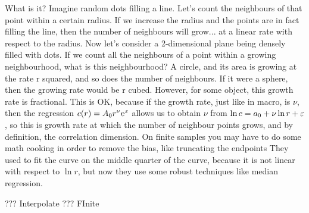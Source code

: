 \documentclass[final,pdftex]{../../template/epsilonj}
\begin{document}
What is it? Imagine random dots filling a line. Let's count the neighbours of that point within a certain radius. If we increase the radius and the points are in fact filling the line, then the number of neighbours will grow... at a linear rate with respect to the radius. Now let's consider a 2-dimensional plane being densely filled with dots. If we count all the neighbours of a point within a growing neighbourhood, what is this neighbourhood? A circle, and its area is growing at the rate r squared, and so does the number of neighbours. If it were a sphere, then the growing rate would be r cubed. However, for some object, this growth rate is fractional. This is OK, because if the growth rate, just like in macro, is $\nu$, then the regression $c(r) = A_0 r^\nu {\mkern1mu\mathrm{e}\mkern1mu}^\varepsilon$ allows us to obtain $\nu$ from $\ln c = a_0 + \nu \ln r + \varepsilon$, so this is growth rate at which the number of neighbour points grows, and by definition, the correlation dimension.
On finite samples you may have to do some math cooking in order to remove the bias, like truncating the endpoints 
They used to fit the curve on the middle quarter of the curve, because it is not linear with respect to $\ln r$, but now they use some robust techniques like median regression.


??? Interpolate
??? FInite
\end{document}
